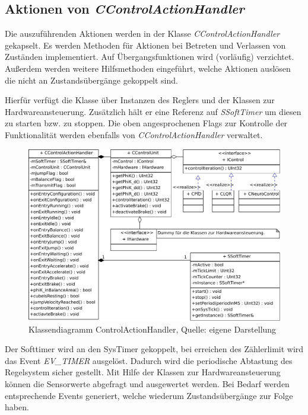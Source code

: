 \documentclass{article}
\begin{document}
\subsection*{Aktionen von \textit{CControlActionHandler}}
Die auszuführenden Aktionen werden in der Klasse \textit{CControlActionHandler} gekapselt. Es werden Methoden für Aktionen bei Betreten und Verlassen von Zuständen implementiert. Auf Übergangsfunktionen wird (vorläufig) verzichtet. Außerdem werden weitere Hilfsmethoden eingeführt, welche Aktionen auslösen die nicht an Zustandsübergänge gekoppelt sind.

Hierfür verfügt die Klasse über Instanzen des Reglers und der Klassen zur Hardwareansteuerung. Zusätzlich hält er eine Referenz auf \textit{SSoftTimer} um diesen zu starten bzw. zu stoppen. Die oben angesprochenen Flags zur Kontrolle der Funktionalität werden ebenfalls von \textit{CControlActionHandler} verwaltet.

\begin{figure}[h]
	\includegraphics[width=\linewidth]{ControlActionHandler}
	\caption{Klassendiagramm ControlActionHandler, Quelle: eigene Darstellung}
\end{figure}

Der Softtimer wird an den SysTimer gekoppelt, bei erreichen des Zählerlimit wird das Event \textit{EV\_TIMER} ausgelöst. Dadurch wird die periodische Abtastung des Regelsystem sicher gestellt.
Mit Hilfe der Klassen zur Hardwareansteuerung können die Sensorwerte abgefragt und ausgewertet werden. Bei Bedarf werden entsprechende Events generiert, welche wiederum Zustandsübergänge zur Folge haben.
\end{document}
